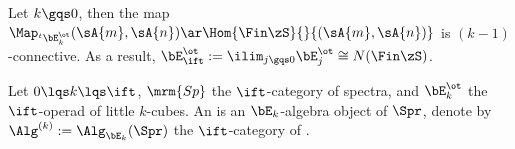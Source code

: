 \documentclass[article, a4paper, twoside]{universal}
\begin{document}
\begin{thm}[5.1.1.4]
    Let $k\gqs0$, then the map $\Map_{{}^{t}\bE_{k}^{\ot}}(\sA{m},\sA{n})\ar\Hom{\Fin\zS}{}{(\sA{m},\sA{n})}$ is $(k-1)$-connective. As a result, $\bE_{\ift}^{\ot}:=\ilim_{j\gqs0}\bE_{j}^{\ot}\cong N(\Fin\zS)$.
\end{thm}


\begin{dfn}[7.1.0.1]
    Let $0\lqs k\lqs \ift$, $\mrm{Sp}$ the $\ift$-category of spectra, and $\bE_{k}^{\ot}$ the $\ift$-operad of little $k$-cubes. An  is an $\bE_{k}$-algebra object of $\Spr$, denote by $\Alg^{(k)}:=\Alg_{\bE_{k}}(\Spr)$ the $\ift$-category of .
\end{dfn}



\printref
\end{document}
